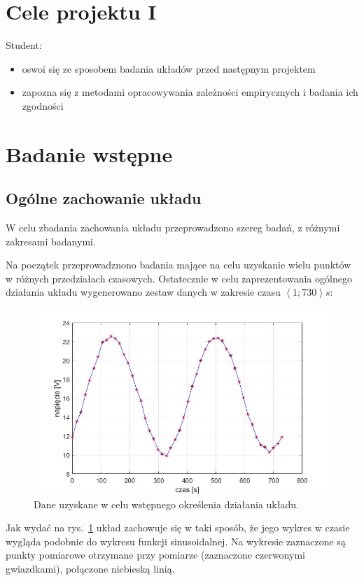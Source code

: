 \documentclass[a4paper, 12pt]{mwart}
\begin{document}
	\section{Cele projektu I}
		Student:
		\begin{itemize}
			\item oswoi się ze sposobem badania układów przed następnym projektem
			\item zapozna się z metodami opracowywania zależności empirycznych i badania ich zgodności
		\end{itemize}

	\section{Badanie wstępne}
		\subsection{Ogólne zachowanie układu}
			W celu zbadania zachowania układu przeprowadzono szereg badań, z różnymi zakresami badanymi.

			Na początek przeprowadznono badania mające na celu uzyskanie wielu punktów w różnych 
			przedziałach czasowych. Ostatecznie w celu zaprezentowania ogólnego działania układu 
			wygenerowano zestaw danych w zakresie czasu $\left< 1;730 \right> s$:
			\begin{figure}[h]
				\begin{center}
					\includegraphics[width = 0.7\linewidth]{graphs/1A.jpg}
					\caption{Dane uzyskane w celu wstępnego określenia działania układu.}
					\label{fig:1A}
				\end{center}
			\end{figure}

			Jak wydać na rys.~\ref{fig:1A} układ zachowuje się w taki sposób, że jego wykres w czasie wygląda 
			podobnie do wykresu funkcji sinusoidalnej. Na wykresie zaznaczone są punkty pomiarowe otrzymane 
			przy pomiarze (zaznaczone czerwonymi gwiazdkami), połączone niebieską linią.
\end{document}
